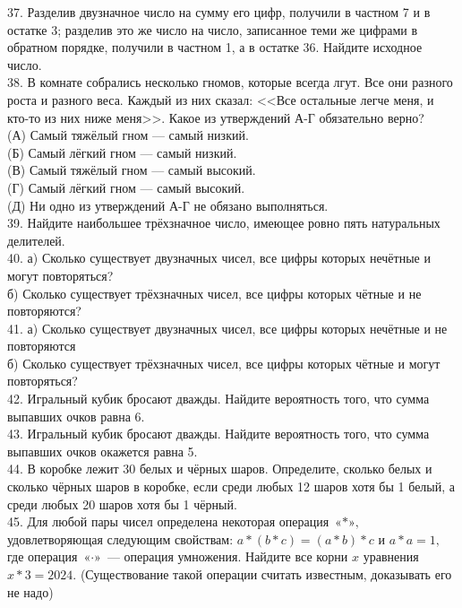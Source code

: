 \documentclass[12pt]{article}
\begin{document}
37. Разделив двузначное число на сумму его цифр, получили в частном 7 и в остатке 3; разделив это же число на число, записанное теми же цифрами в обратном порядке, получили в частном 1, а в остатке 36. Найдите исходное число.\\
38. В комнате собрались несколько гномов, которые всегда лгут. Все они разного роста и разного веса. Каждый из них сказал: <<Все остальные легче меня, и кто-то из них ниже меня>>. Какое из утверждений А-Г обязательно верно?\\
(А) Самый тяжёлый гном --- самый низкий.\\
(Б) Самый лёгкий гном --- самый низкий.\\
(В) Самый тяжёлый гном --- самый высокий.\\
(Г) Самый лёгкий гном --- самый высокий.\\
(Д) Ни одно из утверждений А-Г не обязано выполняться.\\
39. Найдите наибольшее трёхзначное число, имеющее ровно пять натуральных делителей.\\
40. а) Сколько существует двузначных чисел, все цифры которых нечётные и могут повторяться?\\
б) Сколько существует трёхзначных чисел, все цифры которых чётные и не повторяются?\\
41. а) Сколько существует двузначных чисел, все цифры которых нечётные и не повторяются\\
б) Сколько существует трёхзначных чисел, все цифры которых чётные и могут повторяться?\\
42. Игральный кубик бросают дважды. Найдите вероятность того, что сумма выпавших очков равна 6.\\
43. Игральный кубик бросают дважды. Найдите вероятность того, что сумма выпавших очков окажется равна 5.\\
44. В коробке лежит 30 белых и чёрных шаров. Определите, сколько белых и сколько чёрных шаров в коробке, если среди любых 12 шаров хотя бы 1 белый, а среди любых 20 шаров хотя бы 1 чёрный.\\
45. Для любой пары чисел определена некоторая операция $\text{«$\ast$»,}$ удовлетворяющая следующим свойствам:
$a*(b*c)=(a*b)*c$ и $a*a=1,$ где операция $\text{«$\cdot$»}$ --- операция умножения. Найдите все корни $x$ уравнения
$x*3=2024.$ (Существование такой операции считать известным, доказывать его не надо)
\newpage
\end{document}
